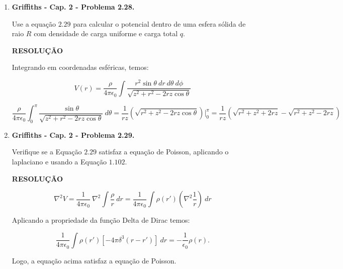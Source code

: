\documentclass[11pt,a4paper]{article}
\begin{document}
\begin{enumerate}
\item \textbf{Griffiths - Cap. 2 - Problema 2.28.}

Use a equação $2.29$ para calcular o potencial dentro de uma esfera sólida de raio $R$ com densidade de carga uniforme e carga total $q$.

\textbf{RESOLUÇÃO}

Integrando em coordenadas esféricas, temos:

$$V(r) = \displaystyle\dfrac{\rho}{4\pi\epsilon_0} \displaystyle\int \displaystyle\dfrac{r^2 \sin \theta \ dr \ d\theta \ d\phi}{\sqrt{z^2 + r^2 - 2rz \cos \theta}}$$

$$\displaystyle\dfrac{\rho}{4\pi\epsilon_0}\displaystyle\int_0^\pi \displaystyle\dfrac{\sin \theta}{\sqrt{z^2 + r^2 - 2rz \cos \theta}} \ d\theta = \displaystyle\dfrac{1}{rz}(\sqrt{r^2 + z^2 - 2rz \cos \theta })|_{0}^{\pi} = \displaystyle\dfrac{1}{rz}(\sqrt{r^2 + z^2 + 2rz} - \sqrt{r^2 + z^2 - 2rz})$$

\item \textbf{Griffiths - Cap. 2 - Problema 2.29.}

Verifique se a Equação $2.29$ satisfaz a equação de Poisson, aplicando o laplaciano e usando a Equação $1.102$.

\textbf{RESOLUÇÃO}

$$\nabla^2V = \displaystyle\dfrac{1}{4\pi\epsilon_0} \ \nabla^2 \displaystyle\int \displaystyle\dfrac{\rho}{r} \ dr = \displaystyle\dfrac{1}{4\pi\epsilon_0} \displaystyle\int \rho(r') \left(\nabla^2 \displaystyle\dfrac{1}{r}\right) \ dr$$

Aplicando a propriedade da função Delta de Dirac temos:

$$\displaystyle\dfrac{1}{4\pi\epsilon_0} \displaystyle\int \rho(r') [-4\pi \delta^3(r - r')] \ dr = -\displaystyle\dfrac{1}{\epsilon_0} \rho(r).$$

Logo, a equação acima satisfaz a equação de Poisson.

\end{enumerate}
	
\end{document}
